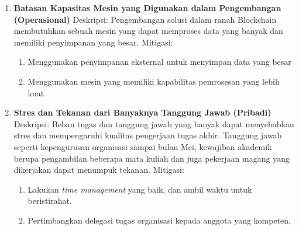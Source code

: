 \begin{enumerate}
\begin{enumerate}
  \end{enumerate}
  \item \textbf{Batasan Kapasitas Mesin yang Digunakan dalam Pengembangan (Operasional)} \newline
  Deskripsi: Pengembangan solusi dalam ranah Blockchain membutuhkan sebuah mesin yang dapat memproses data yang banyak dan memiliki penyimpanan yang besar. \newline
  Mitigasi:
  \begin{enumerate}
    \item Menggunakan penyimpanan eksternal untuk menyimpan data yang besar
    \item Menggunakan mesin yang memiliki kapabilitas pemrosesan yang lebih kuat
  \end{enumerate}
  \item \textbf{Stres dan Tekanan dari Banyaknya Tanggung Jawab (Pribadi)}  \newline
  Deskripsi: Beban tugas dan tanggung jawab yang banyak dapat menyebabkan stres dan mempengaruhi kualitas pengerjaan tugas akhir. Tanggung jawab seperti kepengurusan organisasi sampai bulan Mei, kewajiban akademik berupa pengambilan beberapa mata kuliah dan juga pekerjaan magang yang dikerjakan dapat menumpuk tekanan. \newline 
  Mitigasi:  
  \begin{enumerate}
    \item Lakukan \textit{time management} yang baik, dan ambil waktu untuk beristirahat.  
    \item Pertimbangkan delegasi tugas organisasi kepada anggota yang kompeten.
  \end{enumerate}
\end{enumerate}